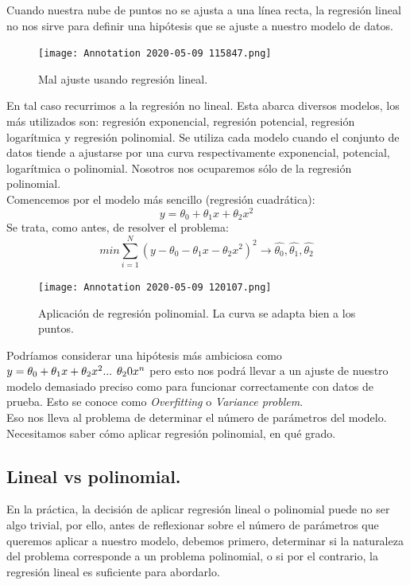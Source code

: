 \documentclass[a4paper,11pt]{article}
\begin{document}
Cuando nuestra nube de puntos no se ajusta a una línea recta, la regresión lineal no nos sirve para definir una hipótesis que se ajuste a nuestro modelo de datos.
\begin{figure}[H]
\centering
\texttt{[image: Annotation 2020-05-09 115847.png]}
\caption{Mal ajuste usando regresión lineal.}
\end{figure}
\noindent
En tal caso recurrimos a la regresión no lineal. Esta abarca diversos modelos, los más utilizados son: regresión exponencial, regresión potencial, regresión logarítmica y regresión polinomial. Se utiliza cada modelo cuando el conjunto de
datos tiende a ajustarse por una curva respectivamente exponencial, potencial,
logarítmica o polinomial. Nosotros nos ocuparemos sólo de la regresión polinomial.\\

\noindent
Comencemos por el modelo más sencillo (regresión cuadrática):
\[
 y=\theta_0+\theta_1 x+\theta_2 x^2
\]
Se trata, como antes, de resolver el problema:
\[
 min\sum_{i=1}^{N}(y-\theta_0-\theta_1 x-\theta_2 x^2)^2\longrightarrow \hat{\theta_0},\hat{\theta_1},\hat{\theta_2}
\] 
\begin{figure}[H]
\centering
\texttt{[image: Annotation 2020-05-09 120107.png]}
\caption{Aplicación de regresión polinomial. La curva se adapta bien a los puntos.}
\end{figure}
\noindent
Podríamos considerar una hipótesis más ambiciosa como $y=\theta_0+\theta_1 x+\theta_2 x^2 ...\hspace{0.15cm} \theta_20 x^n$ pero esto nos podrá llevar a un ajuste de nuestro modelo demasiado preciso como para funcionar correctamente con datos de prueba. Esto se conoce como \textit{Overfitting} o \textit{Variance problem}.\\

\noindent
Eso nos lleva al problema de determinar el número de parámetros del modelo. Necesitamos saber cómo aplicar regresión polinomial, en qué grado.
\subsection{Lineal vs polinomial.}

En la práctica, la decisión de aplicar regresión lineal o polinomial puede no ser algo trivial, por ello, antes de reflexionar sobre el número de parámetros que queremos aplicar a nuestro modelo, debemos primero, determinar si la naturaleza del problema corresponde a un problema polinomial, o si por el contrario, la regresión lineal es suficiente para abordarlo.
\end{document}
